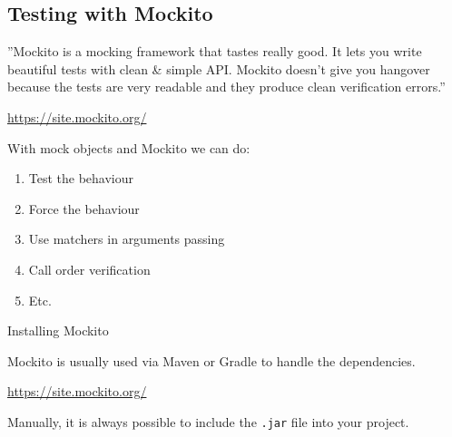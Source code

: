 \documentclass[11pt, xcolor=svgnames]{beamer}
\begin{document}

\subsection{Testing with Mockito}



\begin{frame}

''Mockito is a mocking framework that tastes really good. It lets you write beautiful tests with clean \& simple API. Mockito doesn't give you hangover because the tests are very readable and they produce clean verification errors.''


\url{https://site.mockito.org/}

With mock objects and Mockito we can do:

\begin{enumerate}
  \item Test the behaviour
  \item Force the behaviour
  \item Use matchers in arguments passing
  \item Call order verification
  \item Etc.
\end{enumerate}
\end{frame}



\begin{frame}{Installing Mockito}

Mockito is usually used via Maven or Gradle to handle the dependencies.


\url{https://site.mockito.org/}

Manually, it is always possible to include the \texttt{.jar} file into your project.

\end{frame}
\end{document}
